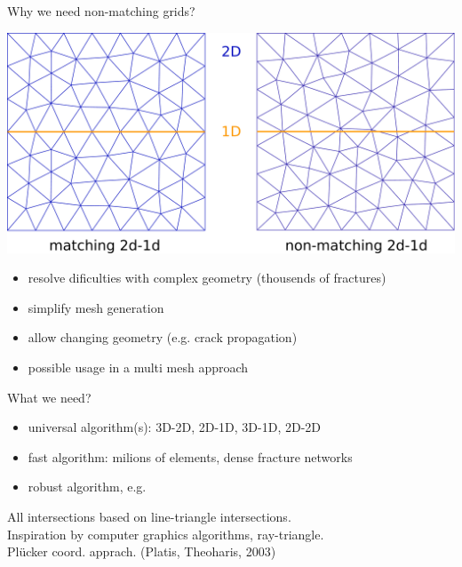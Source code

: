 \documentclass[10pt]{beamer} %
\begin{document}
\begin{frame}{Why we need non-matching grids?}
\begin{center}
\includegraphics[width=0.6\linewidth]{graphics/compatible_noncompatible.pdf} 
\end{center}

\begin{itemize}
 \item resolve dificulties with complex geometry (thousends of fractures)
 \item simplify mesh generation
 \item allow changing geometry (e.g. crack propagation)
 \item possible usage in a multi mesh approach
\end{itemize}

\end{frame}


\begin{frame}{What we need?}
\begin{itemize}
  \item universal algorithm(s): 3D-2D, 2D-1D, 3D-1D, 2D-2D  
  \item fast algorithm: milions of elements, dense fracture networks
  \item robust algorithm, e.g. 
\end{itemize}

\vspace{2ex}
All intersections based on line-triangle intersections.\\

\vspace{2ex}
Inspiration by computer graphics algorithms, ray-triangle.\\
Pl\"ucker coord. apprach. (Platis, Theoharis, 2003) 
\end{frame}
\end{document}
